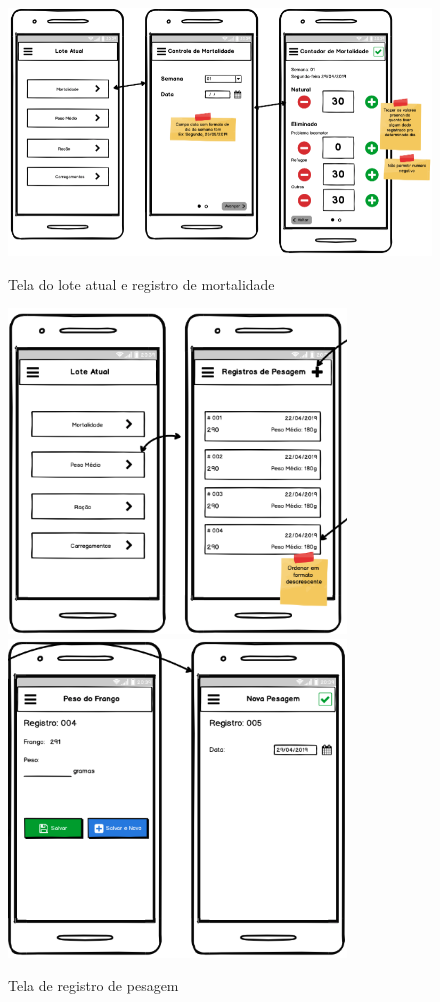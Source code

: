 \begin{apendicesenv}
\begin{figure}[h]
    \centering
    \caption{Tela do lote atual e registro de mortalidade}
    \includegraphics[width=1.0\textwidth]{./dados/figuras/p4.png}
    \label{fig:p4}
\end{figure}

\begin{figure}[h]
    \centering
    \caption{Tela de registro de pesagem}
    \includegraphics[width=0.8\textwidth]{./dados/figuras/p5.png}
    \includegraphics[width=0.8\textwidth]{./dados/figuras/p5_1.png}
    \label{fig:p5}
\end{figure}


\end{apendicesenv}
